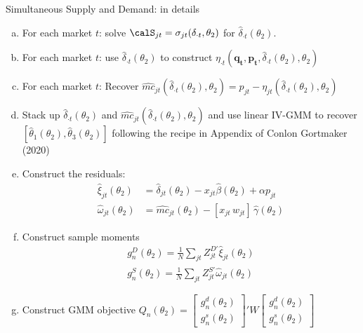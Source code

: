 \begin{frame}{Simultaneous Supply and Demand: in details}
\footnotesize
\begin{enumerate}[(a)]
\item For each market $t$: solve $\calS_{jt} = \sigma_{jt}(\delta_{\cdot t},\theta_2)$ for $\widehat{\delta}_{\cdot t}(\theta_2)$.
\item For each market $t$: use $\widehat{\delta}_{\cdot t}(\theta_2)$ to construct $\eta_{\cdot 
t}(\symbf{q_t},\symbf{p_t},\widehat{\delta}_{\cdot t}(\theta_2),\theta_2)$
\item For each market $t$: Recover $\widehat{mc}_{jt}(\widehat{\delta}_{\cdot t}(\theta_2),\theta_2) = p_{jt} - \eta_{jt}(\widehat{\delta}_{\cdot t}(\theta_2),\theta_2)$
\item Stack up $\widehat{\delta}_{\cdot t}(\theta_2)$ and $\widehat{mc}_{jt}(\widehat{\delta}_{\cdot t}(\theta_2),\theta_2)$ and use linear IV-GMM to recover $[\widehat{\theta}_1(\theta_2), \widehat{\theta}_3(\theta_2) ]$ following the recipe in Appendix of Conlon Gortmaker (2020)
\item Construct the residuals:
\begin{align*}
\nonumber    \widehat{\xi}_{jt}(\theta_2) &= \widehat{\delta}_{jt}(\theta_2) -  x_{jt} \widehat{\beta}(\theta_2) + \alpha p_{jt}\\
    \widehat{\omega}_{jt}(\theta_2) &= \widehat{mc}_{jt}(\theta_2) -  [x_{jt}\, w_{jt}]\, \widehat{\gamma}(\theta_2)
\end{align*}
\item Construct sample moments
\begin{align*}
\nonumber g_n^D(\theta_2)=\frac{1}{N} \sum_{jt} Z_{jt}^{D\prime} \widehat{\xi}_{jt}(\theta_2)\\
 g_n^S(\theta_2)=\frac{1}{N} \sum_{jt} Z_{jt}^{S \prime} \widehat{\omega}_{jt}(\theta_2)
\end{align*}
\item Construct GMM objective $Q_n(\theta_2)= \left[ {\begin{array}{c} g_n^d(\theta_2) \\ g_n^s(\theta_2) \end{array} } \right]' W  \left[ {\begin{array}{c} g_n^d(\theta_2) \\ g_n^s(\theta_2) \end{array} } \right] $
\end{enumerate}
\end{frame}


